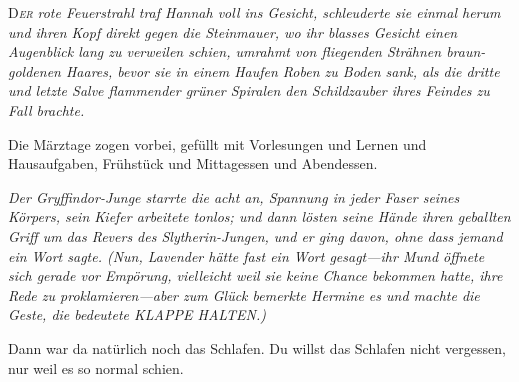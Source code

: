 
\lettrine{D}{\emph{er}} \emph{rote Feuerstrahl traf Hannah voll ins Gesicht, schleuderte sie einmal herum und ihren Kopf direkt gegen die Steinmauer, wo ihr blasses Gesicht einen Augenblick lang zu verweilen schien, umrahmt von fliegenden Strähnen braun-goldenen Haares, bevor sie in einem Haufen Roben zu Boden sank, als die dritte und letzte Salve flammender grüner Spiralen den Schildzauber ihres Feindes zu Fall brachte.}

Die Märztage zogen vorbei, gefüllt mit Vorlesungen und Lernen und Hausaufgaben, Frühstück und Mittagessen und Abendessen.

\emph{Der Gryffindor-Junge starrte die acht an, Spannung in jeder Faser seines Körpers, sein Kiefer arbeitete tonlos; und dann lösten seine Hände ihren geballten Griff um das Revers des Slytherin-Jungen, und er ging davon, ohne dass jemand ein Wort sagte. (Nun, Lavender hätte fast ein Wort gesagt—ihr Mund öffnete sich gerade vor Empörung, vielleicht weil sie keine Chance bekommen hatte, ihre Rede zu proklamieren—aber zum Glück bemerkte Hermine es und machte die Geste, die bedeutete KLAPPE HALTEN.)}

Dann war da natürlich noch das Schlafen. Du willst das Schlafen nicht vergessen, nur weil es so normal schien.

